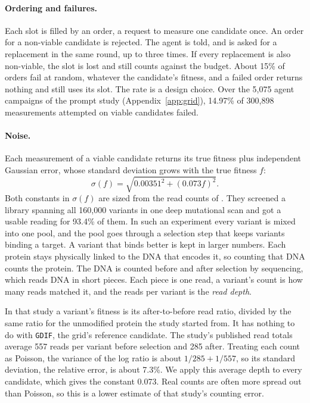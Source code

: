 \paragraph{Ordering and failures.} Each slot is filled by an order, a request to measure one candidate
once. An order for a non-viable candidate is rejected. The agent is told, and is asked for a replacement in
the same round, up to three times. If every replacement is also non-viable, the slot is lost and still
counts against the budget. About 15\% of orders fail at random, whatever the candidate's fitness, and a
failed order returns nothing and still uses its slot. The rate is a design choice. Over the 5{,}075 agent
campaigns of the prompt study (Appendix~\ref{app:grid}), 14.97\% of 300{,}898 measurements attempted on viable candidates failed.

\paragraph{Noise.}
\label{app:noise}
Each measurement of a viable candidate returns its true fitness plus independent Gaussian error, whose
standard deviation grows with the true fitness $f$:
\[ \sigma(f) = \sqrt{0.00351^2 + (0.073 f)^2}. \]
Both constants in $\sigma(f)$ are sized from the read counts of \citet{wu2016adaptation}. They screened a library
spanning all 160{,}000 variants in one deep mutational scan and got a usable reading for 93.4\% of them. In such an experiment every variant is mixed into one
pool, and the pool goes through a selection step that keeps variants binding a target. A variant that binds
better is kept in larger numbers. Each protein stays physically linked to the DNA that encodes it, so
counting that DNA counts the protein. The DNA is counted before and after selection by sequencing, which
reads DNA in short pieces. Each piece is one read, a variant's count is how many reads matched it, and the
reads per variant is the \emph{read depth}.

In that study a variant's fitness is its after-to-before read ratio, divided by the same ratio for the
unmodified protein the study started from. It has nothing to do with \texttt{GDIF}, the grid's reference candidate. The study's
published read totals average 557 reads per variant before selection and 285 after. Treating each count as Poisson, the variance
of the log ratio is about $1/285 + 1/557$, so its standard deviation, the relative error, is about 7.3\%. We apply this
average depth to every candidate, which gives the constant 0.073. Real counts are often more spread out than Poisson, so this is a
lower estimate of that study's counting error.

